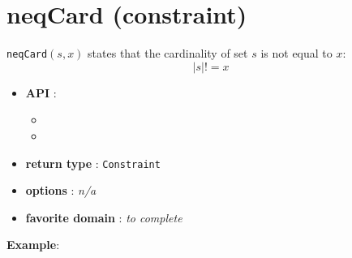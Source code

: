 \label{neqcard}
\hypertarget{neqcard}{}

\section{neqCard (constraint)}\label{neqcard:neqcardconstraint}\hypertarget{neqcard:neqcardconstraint}{}
\begin{notedef}
  \texttt{neqCard}$(s,x)$ states that the cardinality of set $s$ is not equal to $x$:
$$|s| != x$$
\end{notedef}

\begin{itemize}
	\item \textbf{API} :
	\begin{itemize}
		\item {}
		\item {}
	\end{itemize}
	\item \textbf{return type} : \texttt{Constraint}
	\item \textbf{options} : \emph{n/a}
	\item \textbf{favorite domain} : \emph{to complete}
\end{itemize}

\textbf{Example}:


